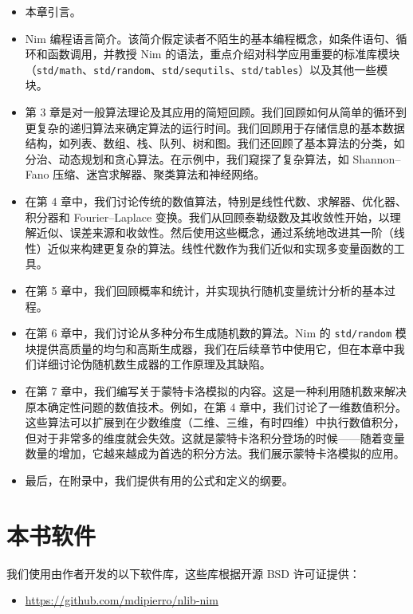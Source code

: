 \documentclass[justified, sixbynine]{tufte-book}
\def\ft{\small\tt}
\theoremstyle{plain}%
\newtheorem * {corollary}{推论}
\theoremstyle{definition}
\theoremstyle{remark}
\newtheorem * {remark}{注记}
\newtheorem * {note}{注释}
\begin{document}
\begin{fullwidth}
\begin{itemize}
\item 本章引言。
\item Nim 编程语言简介。该简介假定读者不陌生的基本编程概念，如条件语句、循环和函数调用，并教授 Nim 的语法，重点介绍对科学应用重要的标准库模块（{\ft std/math}、{\ft std/random}、{\ft std/sequtils}、{\ft std/tables}）以及其他一些模块。
\item 第 3 章是对一般算法理论及其应用的简短回顾。我们回顾如何从简单的循环到更复杂的递归算法来确定算法的运行时间。我们回顾用于存储信息的基本数据结构，如列表、数组、栈、队列、树和图。我们还回顾了基本算法的分类，如分治、动态规划和贪心算法。在示例中，我们窥探了复杂算法，如 Shannon--Fano 压缩、迷宫求解器、聚类算法和神经网络。
\item 在第 4 章中，我们讨论传统的数值算法，特别是线性代数、求解器、优化器、积分器和 Fourier--Laplace 变换。我们从回顾泰勒级数及其收敛性开始，以理解近似、误差来源和收敛性。然后使用这些概念，通过系统地改进其一阶（线性）近似来构建更复杂的算法。线性代数作为我们近似和实现多变量函数的工具。
\item 在第 5 章中，我们回顾概率和统计，并实现执行随机变量统计分析的基本过程。
\item 在第 6 章中，我们讨论从多种分布生成随机数的算法。Nim 的 {\ft std/random} 模块提供高质量的均匀和高斯生成器，我们在后续章节中使用它，但在本章中我们详细讨论伪随机数生成器的工作原理及其缺陷。
\item 在第 7 章中，我们编写关于蒙特卡洛模拟的内容。这是一种利用随机数来解决原本确定性问题的数值技术。例如，在第 4 章中，我们讨论了一维数值积分。这些算法可以扩展到在少数维度（二维、三维，有时四维）中执行数值积分，但对于非常多的维度就会失效。这就是蒙特卡洛积分登场的时候——随着变量数量的增加，它越来越成为首选的积分方法。我们展示蒙特卡洛模拟的应用。

\item 最后，在附录中，我们提供有用的公式和定义的纲要。
\end{itemize}

\section{本书软件}

我们使用由作者开发的以下软件库，这些库根据开源 BSD 许可证提供：

\begin{itemize}
\item \url{https://github.com/mdipierro/nlib-nim}
\end{itemize}


\end{fullwidth}
\end{document}
